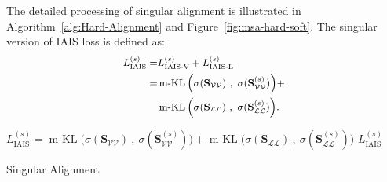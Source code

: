 \documentclass[11pt,a4paper]{article}
\begin{document}
The detailed processing of singular alignment is illustrated in Algorithm~\ref{alg:Hard-Alignment} and Figure~\ref{fig:msa-hard-soft}.
The singular version of IAIS loss is defined as:
\begin{equation}
\small
\begin{split}
    L^{(s)}_\text{IAIS} = & L^{(s)}_\text{IAIS-V} + L^{(s)}_\text{IAIS-L} \\
    = & \operatorname{m-KL} \Big ( \sigma(\mathbf{S}_{\mathcal{VV}})~,~ \sigma(\mathbf{S}_{\mathcal{VV}}^{(s)}) \Big ) + \\
    & \operatorname{m-KL} \Big ( \sigma(\mathbf{S}_{\mathcal{LL}})~,~\sigma(\mathbf{S}_{\mathcal{LL}}^{(s)})  \Big ).
\end{split}
\label{equ:hard-alignment}
\end{equation}
\begin{algorithm}[t]
\small
\DontPrintSemicolon
{}
$L_\text{IAIS}^{(s)} = \operatorname{m-KL} \Big ( \sigma(\mathbf{S}_{\mathcal{VV}})~,~ \sigma(\mathbf{S}_{\mathcal{VV}}^{(s)}) \Big ) + \operatorname{m-KL} \Big ( \sigma(\mathbf{S}_{\mathcal{LL}})~,~ \sigma(\mathbf{S}_{\mathcal{LL}}^{(s)}) \Big )$\; \Return $L_\text{IAIS}^{(s)}$
\caption{Singular Alignment}
\label{alg:Hard-Alignment}
\end{algorithm}
\end{document}
